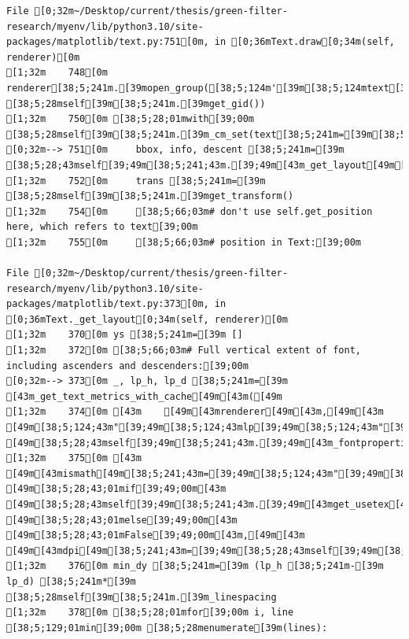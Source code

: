 \documentclass[
  letterpaper,
  DIV=11,
  numbers=noendperiod]{scrartcl}
\begin{document}
\begin{verbatim}
File [0;32m~/Desktop/current/thesis/green-filter-research/myenv/lib/python3.10/site-packages/matplotlib/text.py:751[0m, in [0;36mText.draw[0;34m(self, renderer)[0m
[1;32m    748[0m renderer[38;5;241m.[39mopen_group([38;5;124m'[39m[38;5;124mtext[39m[38;5;124m'[39m, [38;5;28mself[39m[38;5;241m.[39mget_gid())
[1;32m    750[0m [38;5;28;01mwith[39;00m [38;5;28mself[39m[38;5;241m.[39m_cm_set(text[38;5;241m=[39m[38;5;28mself[39m[38;5;241m.[39m_get_wrapped_text()):
[0;32m--> 751[0m     bbox, info, descent [38;5;241m=[39m [38;5;28;43mself[39;49m[38;5;241;43m.[39;49m[43m_get_layout[49m[43m([49m[43mrenderer[49m[43m)[49m
[1;32m    752[0m     trans [38;5;241m=[39m [38;5;28mself[39m[38;5;241m.[39mget_transform()
[1;32m    754[0m     [38;5;66;03m# don't use self.get_position here, which refers to text[39;00m
[1;32m    755[0m     [38;5;66;03m# position in Text:[39;00m

File [0;32m~/Desktop/current/thesis/green-filter-research/myenv/lib/python3.10/site-packages/matplotlib/text.py:373[0m, in [0;36mText._get_layout[0;34m(self, renderer)[0m
[1;32m    370[0m ys [38;5;241m=[39m []
[1;32m    372[0m [38;5;66;03m# Full vertical extent of font, including ascenders and descenders:[39;00m
[0;32m--> 373[0m _, lp_h, lp_d [38;5;241m=[39m [43m_get_text_metrics_with_cache[49m[43m([49m
[1;32m    374[0m [43m    [49m[43mrenderer[49m[43m,[49m[43m [49m[38;5;124;43m"[39;49m[38;5;124;43mlp[39;49m[38;5;124;43m"[39;49m[43m,[49m[43m [49m[38;5;28;43mself[39;49m[38;5;241;43m.[39;49m[43m_fontproperties[49m[43m,[49m
[1;32m    375[0m [43m    [49m[43mismath[49m[38;5;241;43m=[39;49m[38;5;124;43m"[39;49m[38;5;124;43mTeX[39;49m[38;5;124;43m"[39;49m[43m [49m[38;5;28;43;01mif[39;49;00m[43m [49m[38;5;28;43mself[39;49m[38;5;241;43m.[39;49m[43mget_usetex[49m[43m([49m[43m)[49m[43m [49m[38;5;28;43;01melse[39;49;00m[43m [49m[38;5;28;43;01mFalse[39;49;00m[43m,[49m[43m [49m[43mdpi[49m[38;5;241;43m=[39;49m[38;5;28;43mself[39;49m[38;5;241;43m.[39;49m[43mfigure[49m[38;5;241;43m.[39;49m[43mdpi[49m[43m)[49m
[1;32m    376[0m min_dy [38;5;241m=[39m (lp_h [38;5;241m-[39m lp_d) [38;5;241m*[39m [38;5;28mself[39m[38;5;241m.[39m_linespacing
[1;32m    378[0m [38;5;28;01mfor[39;00m i, line [38;5;129;01min[39;00m [38;5;28menumerate[39m(lines):


\end{verbatim}
\end{document}

